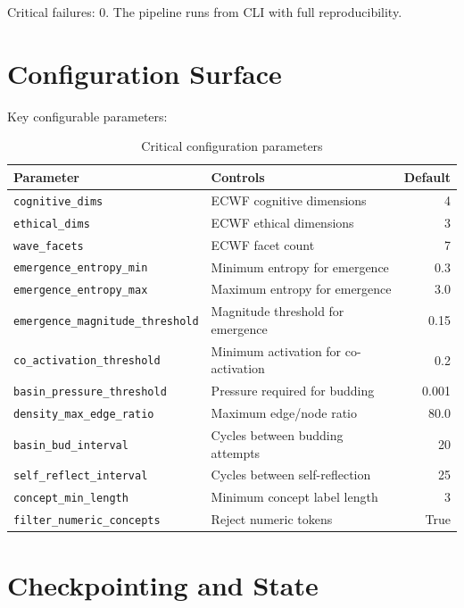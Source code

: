 \documentclass[11pt,a4paper]{article}
\begin{document}
Critical failures: 0. The pipeline runs from CLI with full reproducibility.

\section{Configuration Surface}

Key configurable parameters:

\begin{table}[H]
\centering
\caption{Critical configuration parameters}
\label{tab:config}
\begin{tabular}{@{}llr@{}}
\toprule
\textbf{Parameter} & \textbf{Controls} & \textbf{Default} \\
\midrule
\texttt{cognitive\_dims} & ECWF cognitive dimensions & 4 \\
\texttt{ethical\_dims} & ECWF ethical dimensions & 3 \\
\texttt{wave\_facets} & ECWF facet count & 7 \\
\texttt{emergence\_entropy\_min} & Minimum entropy for emergence & 0.3 \\
\texttt{emergence\_entropy\_max} & Maximum entropy for emergence & 3.0 \\
\texttt{emergence\_magnitude\_threshold} & Magnitude threshold for emergence & 0.15 \\
\texttt{co\_activation\_threshold} & Minimum activation for co-activation & 0.2 \\
\texttt{basin\_pressure\_threshold} & Pressure required for budding & 0.001 \\
\texttt{density\_max\_edge\_ratio} & Maximum edge/node ratio & 80.0 \\
\texttt{basin\_bud\_interval} & Cycles between budding attempts & 20 \\
\texttt{self\_reflect\_interval} & Cycles between self-reflection & 25 \\
\texttt{concept\_min\_length} & Minimum concept label length & 3 \\
\texttt{filter\_numeric\_concepts} & Reject numeric tokens & True \\
\bottomrule
\end{tabular}
\end{table}

\section{Checkpointing and State}
\end{document}
